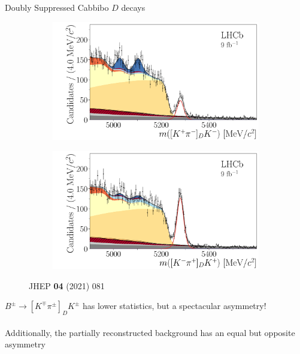 \documentclass[dvipsnames]{beamer}
\begin{document}
\begin{frame}{Doubly Suppressed Cabbibo $D$ decays}
  \begin{figure}
    \centering
    \begin{subfigure}{0.5\textwidth}
      \includegraphics[width = 1.0\textwidth]{Plots/B2DK_D2Kpi_Minus.pdf}
    \end{subfigure}%
    \begin{subfigure}{0.5\textwidth}
      \includegraphics[width = 1.0\textwidth]{Plots/B2DK_D2Kpi_Plus.pdf}
    \end{subfigure}
    \caption*{\tiny JHEP \textbf{04} (2021) 081}
  \end{figure}
  \vspace{-0.5cm}
  \begin{center}
    \Large $B^\pm\to[K^\mp\pi^\pm]_DK^\pm$ has lower statistics, but a spectacular asymmetry!\\~\\
    \large Additionally, the partially reconstructed background has an equal but opposite asymmetry
  \end{center}
\end{frame}
\end{document}
